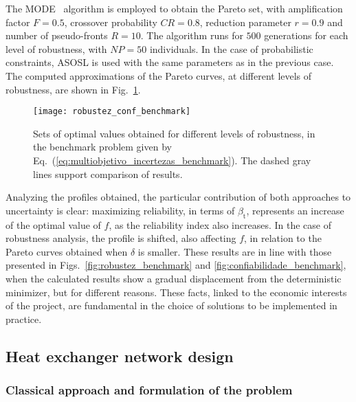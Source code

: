\documentclass[final,5p,times,twocolumn,numbers]{elsarticle}
\begin{document}
The MODE~\cite{bib:lobato2011} algorithm is employed to obtain the Pareto set, with amplification factor $ F = 0.5 $, crossover probability $ CR = 0.8 $, reduction parameter $ r = 0.9 $ and number of pseudo-fronts $ R = 10 $. The algorithm runs for $ 500 $ generations for each level of robustness, with $ NP = 50 $ individuals. In the case of probabilistic constraints, ASOSL is used with the same parameters as in the previous case. The computed approximations of the Pareto curves, at different levels of robustness, are shown in Fig.~\ref{fig:robustez_conf_benchmark}.

\begin{figure}[!ht]
    \centering
    \texttt{[image: robustez\_conf\_benchmark]}
    \caption{Sets of optimal values obtained for different levels of robustness, in the benchmark problem given by Eq.~(\ref{eq:multiobjetivo_incertezas_benchmark}). The dashed gray lines support comparison of results.}
    \label{fig:robustez_conf_benchmark}
\end{figure}

Analyzing the profiles obtained, the particular contribution of both approaches to uncertainty is clear: maximizing reliability, in terms of $ \beta_{\mathrm{t}} $, represents an increase of the optimal value of $ f $, as the reliability index also increases. In the case of robustness analysis, the profile is shifted, also affecting $ f $, in relation to the Pareto curves obtained when $ \delta $ is smaller. These results are in line with those presented in Figs.~\ref{fig:robustez_benchmark} and \ref{fig:confiabilidade_benchmark}, when the calculated results show a gradual displacement from the deterministic minimizer, but for different reasons. These facts, linked to the economic interests of the project, are fundamental in the choice of solutions to be implemented in practice.

\subsection{Heat exchanger network design} \label{sec:heat_exchanger_design}

\subsubsection{Classical approach and formulation of the problem}
\end{document}
